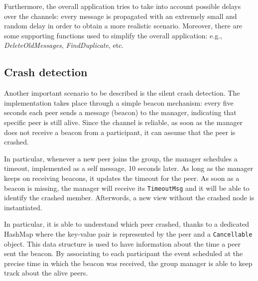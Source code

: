 \documentclass[conference]{IEEEtran}
\begin{document}
Furthermore, the overall application tries to take into account possible delays over the channels: 
every message is propagated with an extremely small and random delay in order to obtain a more realistic scenario. 
Moreover, there are some supporting functions used to simplify the overall application: e.g., \textit{DeleteOldMessages}, \textit{FindDuplicate}, etc.

\subsection{Crash detection}
Another important scenario to be described is the silent crash detection. 
The implementation takes place through a simple beacon mechanism: every five seconds each peer sends a message (beacon) to the manager, 
indicating that specific peer is still alive. Since the channel is reliable, as soon as the manager does not receive a beacon from a participant, 
it can assume that the peer is crashed.

In particular, whenever a new peer joins the group, the manager schedules a timeout, implemented as a self message, 10 seconds later.  
As long as the manager keeps on receiving beacons, it updates the timeout for the peer. 
As soon as a beacon is missing, the manager will receive its \texttt{TimeoutMsg} and it will be able to identify the crashed member. 
Afterwords, a new view without the crashed node is instantiated.

In particular, it is able to understand which peer crashed, thanks to a dedicated HashMap where the key-value pair is represented by 
the peer and a \texttt{Cancellable} object. 
This data structure is used to have information about the time a peer sent the beacon. 
By associating to each participant the event scheduled at the precise time in which the beacon was received, the group manager is able to keep track 
about the alive peers.

\end{document}
